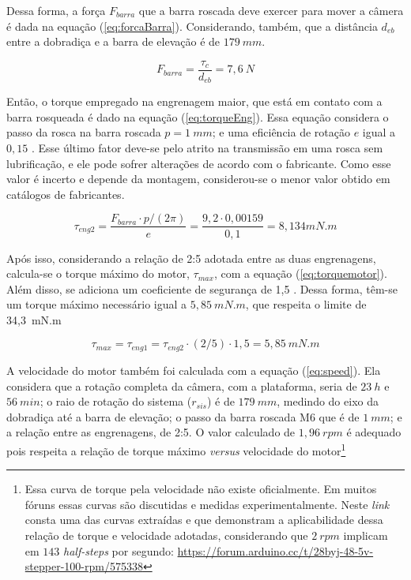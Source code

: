 Dessa forma, a força $ F_{barra} $ que a barra roscada deve exercer para mover a câmera é dada na equação (\ref{eq:forcaBarra}). Considerando, também,  que a distância $ d_{eb} $ entre a dobradiça e a barra de elevação é de $ 179~mm $.

\begin{equation}
	F_{barra} = \dfrac{\tau_{c}}{d_{eb}}= 7,6~N
	\label{eq:forcaBarra}
\end{equation}

Então, o torque empregado na engrenagem maior, que está em contato com a barra rosqueada é dado na equação (\ref{eq:torqueEng}). Essa equação considera o passo da rosca na barra roscada $ p = 1~mm $; e uma eficiência de rotação $ e $ igual a $ 0,15 $ \cite{man:pcblinear}. Esse último fator deve-se pelo atrito na transmissão em uma rosca sem lubrificação, e ele pode sofrer alterações de acordo com o fabricante. Como esse valor é incerto e depende da montagem,  considerou-se o menor valor obtido em catálogos de fabricantes. 

\begin{equation}
	\tau_{eng2} = \dfrac{F_{barra}\cdot p/ (2\pi)}{e} = \dfrac{9,2 \cdot 0,00159}{0,1} = 8,134 mN.m 
	\label{eq:torqueEng}
\end{equation}

Após isso, considerando a relação de 2:5 adotada entre as duas engrenagens, calcula-se o torque máximo do motor, $ \tau_{max} $, com a equação (\ref{eq:torquemotor}). Além disso, se adiciona um coeficiente de segurança de 1,5 \cite{man:sizemotor}. Dessa forma, têm-se um torque máximo necessário igual a $ 5,85~mN.m $, que respeita o limite de 34,3~mN.m


\begin{equation}
	\tau_{max} = \tau_{eng1} = \tau_{eng2} \cdot (2 / 5) \cdot 1,5 = 5,85 ~mN.m
	\label{eq:torquemotor}
\end{equation}


A velocidade do motor também foi calculada com a equação (\ref{eq:speed}). Ela considera que a rotação completa da câmera, com a plataforma, seria de $ 23~h $ e $ 56~min $; o raio de rotação do sistema ($ r_{sis} $)  é de $ 179~mm $, medindo do eixo da dobradiça até a barra de elevação; o passo da barra roscada M6 que é de $ 1~mm $; e a relação entre as engrenagens, de 2:5. O valor calculado de $ 1,96~rpm $ é adequado pois respeita a relação de torque máximo \textit{versus} velocidade do motor\footnote{Essa curva de torque pela velocidade não existe oficialmente. Em muitos fóruns essas curvas são discutidas e medidas experimentalmente. Neste \textit{link} consta uma das curvas extraídas e que demonstram a aplicabilidade dessa relação de torque e velocidade adotadas, considerando que $ 2~rpm $ implicam em $ 143 $ \textit{half-steps} por segundo: \url{https://forum.arduino.cc/t/28byj-48-5v-stepper-100-rpm/575338}} 

